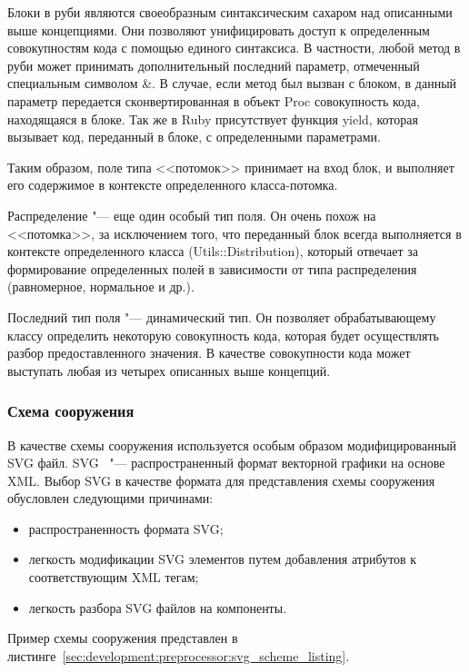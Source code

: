 Блоки в руби являются своеобразным синтаксическим сахаром над описанными выше концепциями.
Они позволяют унифицировать доступ к определенным совокупностям кода с помощью единого синтаксиса.
В частности, любой метод в руби может принимать дополнительный последний параметр, отмеченный специальным символом \&.
В случае, если метод был вызван с блоком, в данный параметр передается сконвертированная в объект Proc совокупность кода, находящаяся в блоке.
Так же в Ruby присутствует функция yield, которая вызывает код, переданный в блоке, с определенными параметрами.

Таким образом, поле типа <<потомок>> принимает на вход блок, и выполняет его содержимое в контексте определенного класса-потомка.

Распределение "--- еще один особый тип поля. Он очень похож на <<потомка>>, за исключением того, что переданный блок всегда выполняется в контексте определенного класса (Utils::Distribution),
который отвечает за формирование определенных полей в зависимости от типа распределения (равномерное, нормальное и др.).

Последний тип поля "--- динамический тип. Он позволяет обрабатывающему классу определить некоторую совокупность кода, которая будет осуществлять разбор предоставленного значения.
В качестве совокупности кода может выступать любая из четырех описанных выше концепций.

\subsubsection{Схема сооружения}
\label{sec:development:preprocessor:svg_scheme}

В качестве схемы сооружения используется особым образом модифицированный SVG файл.
SVG~\cite{svg_home} "--- распространенный формат векторной графики на основе XML.
Выбор SVG в качестве формата для представления схемы сооружения обусловлен следующими причинами:
\begin{itemize}
  \item распространенность формата SVG;
  \item легкость модификации SVG элементов путем добавления атрибутов к соответствующим XML тегам;
  \item легкость разбора SVG файлов на компоненты.
\end{itemize}

Пример схемы сооружения представлен в листинге~\ref{sec:development:preprocessor:svg_scheme_listing}.



